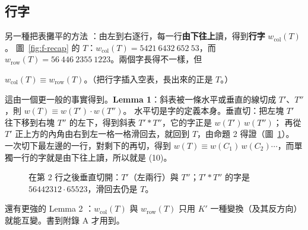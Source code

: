 \subsection{行字}\label{sec:f-colword}

另一種把表攤平的方法 ：由左到右逐行，每一行\textbf{由下往上}讀，得到\textbf{行字} $w_{\mathrm{col}}(T)$。
圖~\ref{fig:f-recap} 的 $T$：$w_{\mathrm{col}}(T)=5421\ 6432\ 652\ 53$，而 $w_{\mathrm{row}}(T)=56\ 446\ 2355\ 1223$。兩個字長得不一樣，但

\begin{thmbox}[(10) \fulref{p.27}]
$w_{\mathrm{col}}(T)\equiv w_{\mathrm{row}}(T)$。（把行字插入空表，長出來的正是 $T$。）
\end{thmbox}

這由一個更一般的事實得到。\textbf{Lemma 1}：斜表被一條水平或垂直的線切成 $T'$、$T''$，則 $w(T)\equiv w(T')\cdot w(T'')$。
水平切是字的定義本身。垂直切：把左塊 $T'$ 往下移到右塊 $T''$ 的左下，得到斜表 $T'*T''$，它的字正是 $w(T')\,w(T'')$；
再從 $T'$ 正上方的內角由右到左一格一格滑回去，就回到 $T$，由命題 2 得證（圖~\ref{fig:f-cut}）。
一次切下最左邊的一行，對剩下的再切，得到 $w(T)\equiv w(C_1)\,w(C_2)\cdots$，而單獨一行的字就是由下往上讀，所以就是 (10)。

\begin{figure}[H]
\centering
\FulCut
\caption{在第 2 行之後垂直切開：$T'$（左兩行）與 $T''$；$T'*T''$ 的字是 $56442312\cdot 65523$，滑回去仍是 $T$。}
\label{fig:f-cut}
\end{figure}

\begin{notebox}
還有更強的 Lemma 2 ：$w_{\mathrm{col}}(T)$ 與 $w_{\mathrm{row}}(T)$ 只用 $K'$ 一種變換（及其反方向）就能互變。書到附錄 A 才用到。
\end{notebox}
